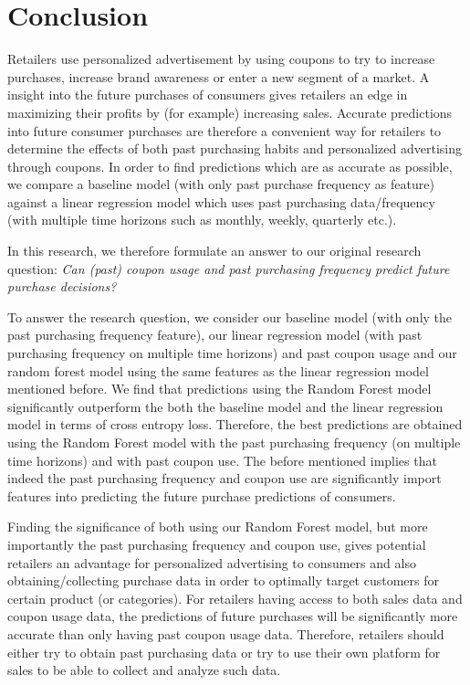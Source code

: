 \section{Conclusion}
Retailers use personalized advertisement by using coupons to try to increase
purchases, increase brand awareness or enter a new segment of a market. A
insight into the future purchases of consumers gives retailers an edge in
maximizing their profits by (for example) increasing sales. Accurate predictions
into future consumer purchases are therefore a convenient way for retailers to
determine the effects of both past purchasing habits and personalized
advertising through coupons. In order to find predictions which are as accurate
as possible, we compare a baseline model (with only past purchase frequency as
feature) against a linear regression model which uses past purchasing
data/frequency (with multiple time horizons such as monthly, weekly, quarterly
etc.).

In this research, we therefore formulate an answer to our original research
question: \textit{Can (past) coupon usage and past purchasing frequency predict
future purchase decisions?}

To answer the research question, we consider our baseline model (with only the
past purchasing frequency feature), our linear regression model (with past
purchasing frequency on multiple time horizons) and past coupon usage and our
random forest model using the same features as the linear regression model
mentioned before. We find that predictions using the Random Forest model
significantly outperform the both the baseline model and the linear regression
model in terms of cross entropy loss. Therefore, the best predictions are
obtained using the Random Forest model with the past purchasing frequency (on
multiple time horizons) and with past coupon use. The before mentioned implies
that indeed the past purchasing frequency and coupon use are significantly
import features into predicting the future purchase predictions of consumers.

Finding the significance of both using our Random Forest model, but more
importantly the past purchasing frequency and coupon use, gives potential
retailers an advantage for personalized advertising to consumers and also
obtaining/collecting purchase data in order to optimally target customers for
certain product (or categories). For retailers having access to both sales data
and coupon usage data, the predictions of future purchases will be significantly
more accurate than only having past coupon usage data. Therefore, retailers
should either try to obtain past purchasing data or try to use their own platform for sales
to be able to collect and analyze such data.

